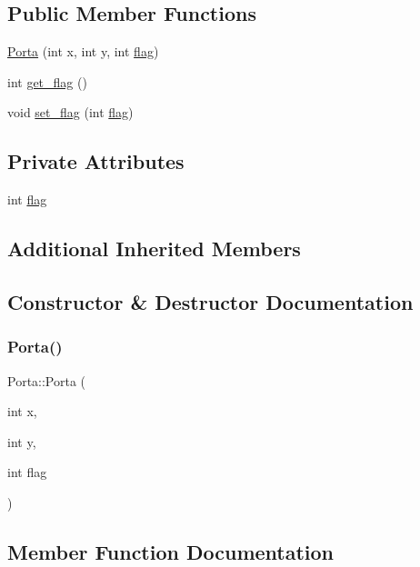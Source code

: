 \subsection*{Public Member Functions}
\begin{DoxyCompactItemize}
\item 
\hyperlink{classPorta_aa17fba5ecd6f7c8a59ec75a15526d6cc}{Porta} (int x, int y, int \hyperlink{classPorta_a8db544173490043789a14eaae3bf8ed6}{flag})
\item 
int \hyperlink{classPorta_ae2c04fc5bf8ddce2195252c526f653b8}{get\+\_\+flag} ()
\item 
void \hyperlink{classPorta_a3ac51e6aa3d03be6bf01a73e748cf435}{set\+\_\+flag} (int \hyperlink{classPorta_a8db544173490043789a14eaae3bf8ed6}{flag})
\end{DoxyCompactItemize}
\subsection*{Private Attributes}
\begin{DoxyCompactItemize}
\item 
int \hyperlink{classPorta_a8db544173490043789a14eaae3bf8ed6}{flag}
\end{DoxyCompactItemize}
\subsection*{Additional Inherited Members}


\subsection{Constructor \& Destructor Documentation}
\mbox{\label{classPorta_aa17fba5ecd6f7c8a59ec75a15526d6cc}} 
\subsubsection{\texorpdfstring{Porta()}{Porta()}}
{\footnotesize\ttfamily Porta\+::\+Porta (\begin{DoxyParamCaption}\item[{int}]{x,  }\item[{int}]{y,  }\item[{int}]{flag }\end{DoxyParamCaption})}



\subsection{Member Function Documentation}
\mbox{\label{classPorta_ae2c04fc5bf8ddce2195252c526f653b8}} 
